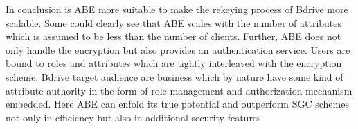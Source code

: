 In conclusion is \ac{ABE} more suitable to make the rekeying process of Bdrive more scalable. Some could clearly see that \ac{ABE} scales with the number of attributes which is assumed to be less than the number of clients. Further, \ac{ABE} does not only handle the encryption but also provides an authentication service. Users are bound to roles and attributes which are tightly interleaved with the encryption scheme. Bdrive target audience are business which by nature have some kind of attribute authority in the form of role management and authorization mechanism embedded. Here \ac{ABE} can enfold its true potential and outperform SGC schemes not only in efficiency but also in additional security features. 